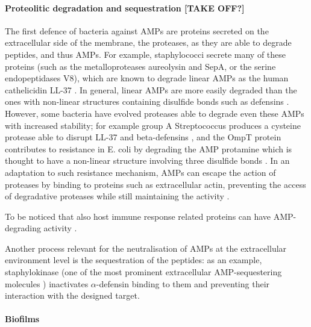 \paragraph{Proteolitic degradation and sequestration [TAKE OFF?]}
The first defence of bacteria against AMPs are proteins secreted on the extracellular side of the membrane, the proteases, as they are able to degrade peptides, and thus AMPs.
%
For example, staphylococci secrete many of these proteins (such as the metalloproteases aureolysin and SepA, or the serine endopeptidases V8), which are known to degrade linear AMPs as the human cathelicidin LL-37 \cite{Sieprawska-Lupa2004,Teufel1993}.
%
In general, linear AMPs are more easily degraded than the ones with non-linear structures containing disulfide bonds \cite{Peschel2006} such as defensins \cite{Selsted1989}.
However, some bacteria have evolved proteases able to degrade even these AMPs with increased stability; for example group A Streptococcus produces a cysteine protease able to disrupt LL-37 and beta-defensins \cite{Schmidtchen2002,Baranska-Rybak2006,Nelson2011,Frick2011}, and the OmpT protein contributes to resistance in E. coli by degrading the AMP protamine \cite{Stumpe1998} which is thought to have a non-linear structure involving three disulfide bonds \cite{Biegeleisen2006}.
%
In an adaptation to such resistance mechanism, AMPs can escape the action of proteases by binding to proteins such as extracellular actin, preventing the access of degradative proteases while still maintaining the activity \cite{Sol2014}.

To be noticed that also host immune response related proteins can have AMP-degrading activity \cite{Taggart2003}.

Another process relevant for the neutralisation of AMPs at the extracellular environment level is the sequestration of the peptides: as an example, staphylokinase (one of the most prominent extracellular AMP-sequestering molecules \cite{Bokarewa2004,Jin2004}) inactivates $\alpha$-defensin binding to them and preventing their interaction with the designed target.


\paragraph{Biofilms}

